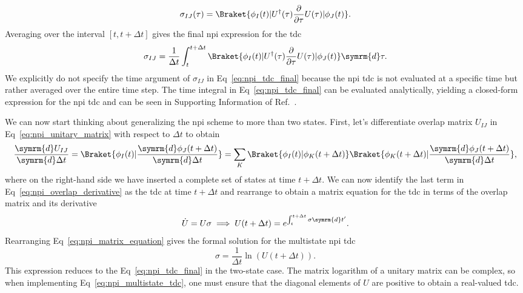 \begin{equation}\label{eq:npi_overlap}
\sigma_{IJ}(\tau)=\Braket{\phi_I(t)\vert U^\dagger(\tau)\frac{\partial}{\partial\tau}U(\tau)\vert\phi_J(t)}.
\end{equation}
Averaging over the interval $[t,t+\Delta t]$ gives the final \acrshort{npi} expression for the \acrshort{tdc}
\begin{equation}\label{eq:npi_tdc_final}
\sigma_{IJ}=\frac{1}{\Delta t}\int_t^{t+\Delta t}\Braket{\phi_I(t)\vert U^\dagger(\tau)\frac{\partial}{\partial\tau}U(\tau)\vert\phi_J(t)}\symrm{d}\tau.
\end{equation}
We explicitly do not specify the time argument of $\sigma_{IJ}$ in Eq~\eqref{eq:npi_tdc_final} because the \acrshort{npi} \acrshort{tdc} is not evaluated at a specific time but rather averaged over the entire time step. The time integral in Eq~\eqref{eq:npi_tdc_final} can be evaluated analytically, yielding a closed-form expression for the \acrshort{npi} \acrshort{tdc} and can be seen in Supporting Information of Ref.~\cite{10.1021/jz5009449}.

We can now start thinking about generalizing the \acrshort{npi} scheme to more than two states. First, let's differentiate overlap matrix $U_{IJ}$ in Eq~\eqref{eq:npi_unitary_matrix} with respect to $\Delta t$ to obtain
\begin{equation}\label{eq:npi_overlap_derivative}
\frac{\symrm{d}U_{IJ}}{\symrm{d}\Delta t}=\Braket{\phi_I(t)\vert\frac{\symrm{d}\phi_J(t+\Delta t)}{\symrm{d}\Delta t}}=\sum_K\Braket{\phi_I(t)\vert\phi_K(t+\Delta t)}\Braket{\phi_K(t+\Delta t)\vert\frac{\symrm{d}\phi_J(t+\Delta t)}{\symrm{d}\Delta t}},
\end{equation}
where on the right-hand side we have inserted a complete set of states at time $t+\Delta t$. We can now identify the last term in Eq~\eqref{eq:npi_overlap_derivative} as the \acrshort{tdc} at time $t+\Delta t$ and rearrange to obtain a matrix equation for the \acrshort{tdc} in terms of the overlap matrix and its derivative
\begin{equation}\label{eq:npi_matrix_equation}
\dot U=U\sigma\implies U(t+\Delta t)=e^{\int_t^{t+\Delta t}\sigma\symrm{d}t'}.
\end{equation}
Rearranging Eq~\eqref{eq:npi_matrix_equation} gives the formal solution for the multistate \acrshort{npi} \acrshort{tdc}
\begin{equation}\label{eq:npi_multistate_tdc}
\sigma=\frac{1}{\Delta t}\ln\left(U(t+\Delta t)\right).
\end{equation}
This expression reduces to the Eq~\eqref{eq:npi_tdc_final} in the two-state case. The matrix logarithm of a unitary matrix can be complex, so when implementing Eq~\eqref{eq:npi_multistate_tdc}, one must ensure that the diagonal elements of $U$ are positive to obtain a real-valued \acrshort{tdc}.
